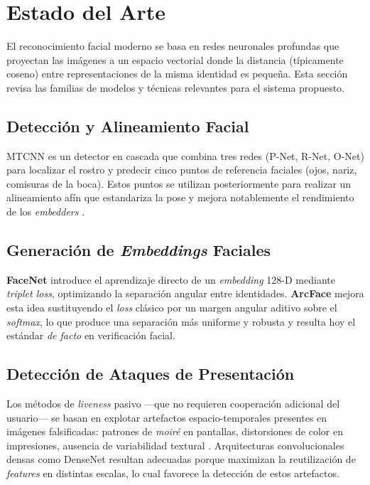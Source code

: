 \section{Estado del Arte}
\label{sec:estado_arte}

El reconocimiento facial moderno se basa en redes neuronales profundas que proyectan las imágenes a un espacio vectorial donde la distancia (típicamente coseno) entre representaciones de la misma identidad es pequeña. Esta sección revisa las familias de modelos y técnicas relevantes para el sistema propuesto.

\subsection{Detección y Alineamiento Facial}
\label{subsec:deteccion}

MTCNN \cite{zhang2016mtcnn} es un detector en cascada que combina tres redes (P-Net, R-Net, O-Net) para localizar el rostro y predecir cinco puntos de referencia faciales (ojos, nariz, comisuras de la boca). Estos puntos se utilizan posteriormente para realizar un alineamiento afín que estandariza la pose y mejora notablemente el rendimiento de los \textit{embedders} \cite{zeng2021occlusion}.

\subsection{Generación de \textit{Embeddings} Faciales}
\label{subsec:embeddings}

\textbf{FaceNet} \cite{schroff2015facenet} introduce el aprendizaje directo de un \textit{embedding} 128-D mediante \textit{triplet loss}, optimizando la separación angular entre identidades. \textbf{ArcFace} \cite{deng2019arcface} mejora esta idea sustituyendo el \textit{loss} clásico por un margen angular aditivo sobre el \textit{softmax}, lo que produce una separación más uniforme y robusta y resulta hoy el estándar \textit{de facto} en verificación facial.

\subsection{Detección de Ataques de Presentación}
\label{subsec:liveness}

Los métodos de \textit{liveness} pasivo —que no requieren cooperación adicional del usuario— se basan en explotar artefactos espacio-temporales presentes en imágenes falsificadas: patrones de \textit{moiré} en pantallas, distorsiones de color en impresiones, ausencia de variabilidad textural \cite{ramachandra2017pad}. Arquitecturas convolucionales densas como DenseNet \cite{huang2017densenet} resultan adecuadas porque maximizan la reutilización de \textit{features} en distintas escalas, lo cual favorece la detección de estos artefactos.

